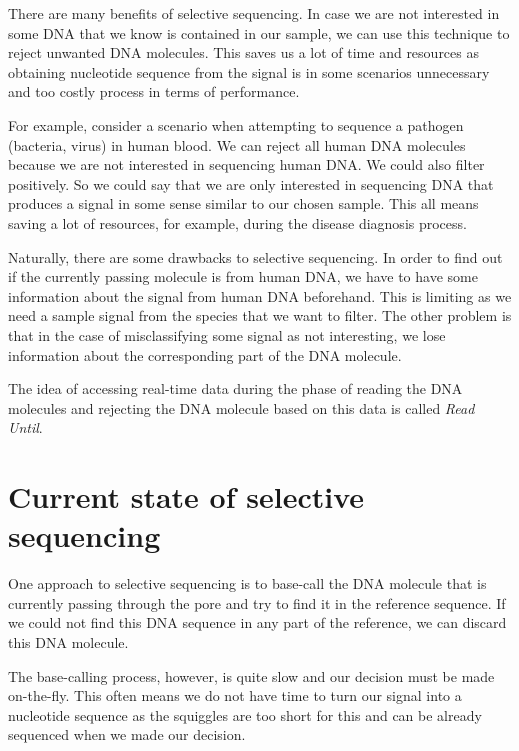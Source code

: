 There are many benefits of selective sequencing. In case we are not interested
in some DNA that we know is contained in our sample, we can use this technique to
reject unwanted DNA molecules. This saves us a lot of time and resources as obtaining
nucleotide sequence from the signal is in some scenarios unnecessary and too
costly process in terms of performance.

For example, consider a scenario when attempting to sequence a pathogen (bacteria, virus) in human blood. We can
reject all human DNA molecules because we are not interested in sequencing human
DNA. We could also filter positively. So we could say that we are only
interested in sequencing DNA that produces a signal in some sense similar to our
chosen sample. This all means saving a lot of resources, for example, during the disease diagnosis process.

Naturally, there are some drawbacks to selective sequencing. In order to find out
if the currently passing molecule is from human DNA, we have to have some information
about the signal from human DNA beforehand. This is limiting as we need a sample signal from
the species that we want to filter. The other problem is that in the case of misclassifying
some signal as not interesting, we lose information about the corresponding
part of the DNA molecule.

The idea of accessing real-time data during the phase of reading the DNA molecules
and rejecting the DNA molecule based on this data is called \textit{Read Until}. 

\section{Current state of selective sequencing}
\label{section:currState}


One approach to selective sequencing is to base-call the DNA molecule that is
currently passing through the pore and try to find it in the reference sequence.
If we could not find this DNA sequence in any part of the reference, we can discard this DNA molecule.

The base-calling process, however, is quite slow and our decision must be made on-the-fly.
This often means we do not have time to turn our signal into a nucleotide sequence
as the squiggles are too short for this and can be already sequenced when we made our decision.

